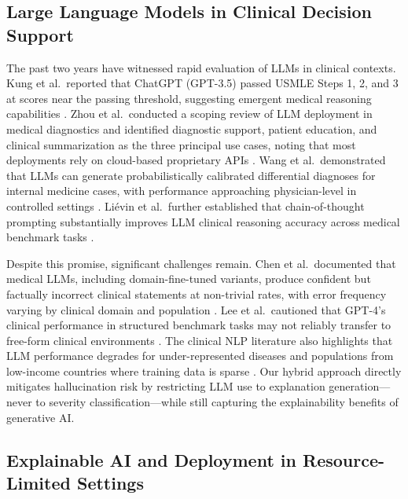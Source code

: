 \documentclass[12pt,a4paper]{article}
\begin{document}
\subsection{Large Language Models in Clinical Decision Support}

The past two years have witnessed rapid evaluation of LLMs in clinical contexts. Kung et al.\ reported that ChatGPT (GPT-3.5) passed USMLE Steps 1, 2, and 3 at scores near the passing threshold, suggesting emergent medical reasoning capabilities \cite{ref5}. Zhou et al.\ conducted a scoping review of LLM deployment in medical diagnostics and identified diagnostic support, patient education, and clinical summarization as the three principal use cases, noting that most deployments rely on cloud-based proprietary APIs \cite{ref1}. Wang et al.\ demonstrated that LLMs can generate probabilistically calibrated differential diagnoses for internal medicine cases, with performance approaching physician-level in controlled settings \cite{ref3}. Li\'{e}vin et al.\ further established that chain-of-thought prompting substantially improves LLM clinical reasoning accuracy across medical benchmark tasks \cite{ref15}.

Despite this promise, significant challenges remain. Chen et al.\ documented that medical LLMs, including domain-fine-tuned variants, produce confident but factually incorrect clinical statements at non-trivial rates, with error frequency varying by clinical domain and population \cite{ref22}. Lee et al.\ cautioned that GPT-4's clinical performance in structured benchmark tasks may not reliably transfer to free-form clinical environments \cite{ref25}. The clinical NLP literature also highlights that LLM performance degrades for under-represented diseases and populations from low-income countries where training data is sparse \cite{ref21}. Our hybrid approach directly mitigates hallucination risk by restricting LLM use to explanation generation---never to severity classification---while still capturing the explainability benefits of generative AI.

\subsection{Explainable AI and Deployment in Resource-Limited Settings}
\end{document}

